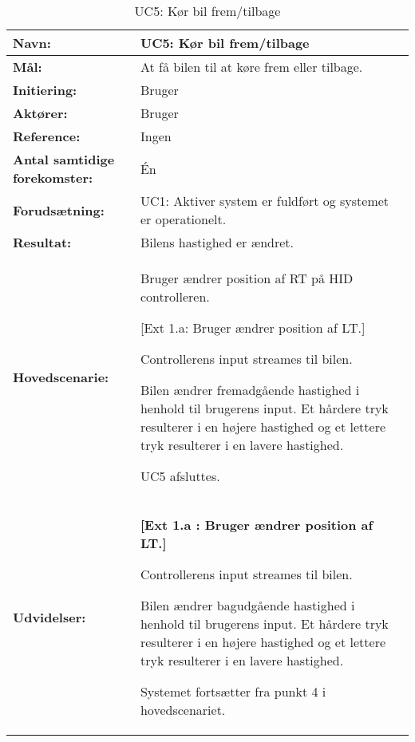 \begin{table}[h]
\begin{tabularx}{\textwidth}{| L{3.3 cm} | Z |} \hline

\textbf{Navn:} 						& UC5: Kør bil frem/tilbage\\ \hline
\textbf{Mål:}						& At få bilen til at køre frem eller tilbage. \\ \hline
\textbf{Initiering:}				& Bruger \\ \hline
\textbf{Aktører:} 					& Bruger \\ \hline
\textbf{Reference:} 				& Ingen \\ \hline
\textbf{Antal samtidige forekomster:} & Én \\ \hline
\textbf{Forudsætning:} 				& UC1: Aktiver system er fuldført og systemet er operationelt. \\ \hline
\textbf{Resultat:}					& Bilens hastighed er ændret. \\ \hline
\textbf{Hovedscenarie:}				& 

\begin{packed_enum}
\item Bruger ændrer position af RT på HID controlleren.
	\begin{packed_item}\itemsep1pt \parskip0pt 
	\item {[}Ext 1.a: Bruger ændrer position af LT.{]}
	\end{packed_item}
\item Controllerens input streames til bilen.
\item Bilen ændrer fremadgående hastighed i henhold til brugerens input. Et hårdere tryk resulterer i en højere hastighed og et lettere tryk resulterer i en lavere hastighed.
\item UC5 afsluttes.
\end{packed_enum} \\ \hline
\textbf{Udvidelser:}				&  
\textbf{{[}Ext 1.a : Bruger ændrer position af LT.{]}}
	\begin{packed_enum}\itemsep1pt \parskip0pt 
		\item Controllerens input streames til bilen.
		\item Bilen ændrer bagudgående hastighed i henhold til brugerens input. Et hårdere tryk resulterer i en højere hastighed og et lettere tryk resulterer i en lavere hastighed.
		\item Systemet fortsætter fra punkt 4 i hovedscenariet.
	\end{packed_enum}
\\ \hline
\end{tabularx}
\caption{UC5: Kør bil frem/tilbage}
\label{tbl:UC5}
\end{table}